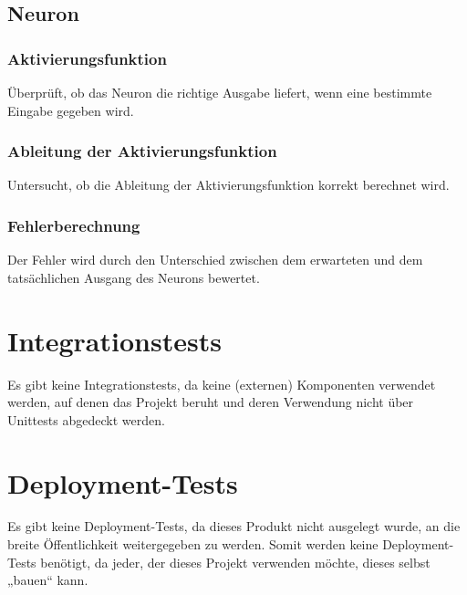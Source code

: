 \subsection{Neuron}
\label{sec:DesignNeuron}
\subsubsection{Aktivierungsfunktion}
\label{sec:DesignAktivierungsfunktion}
Überprüft, ob das Neuron die richtige Ausgabe liefert, wenn eine bestimmte Eingabe gegeben wird.
\subsubsection{Ableitung der Aktivierungsfunktion}
\label{sec:DesignAbleitungDerAktivierungsfunktion}
Untersucht, ob die Ableitung der Aktivierungsfunktion korrekt berechnet wird.
\subsubsection{Fehlerberechnung  }
\label{sec:DesignFehlerberechnung}
Der Fehler wird durch den Unterschied zwischen dem erwarteten und dem tatsächlichen Ausgang des Neurons bewertet.

\section{Integrationstests}
Es gibt keine Integrationstests, da keine (externen) Komponenten verwendet werden, auf denen das Projekt beruht und deren Verwendung nicht über Unittests abgedeckt werden.

\section{Deployment-Tests}
Es gibt keine Deployment-Tests, da dieses Produkt nicht ausgelegt wurde, an die breite Öffentlichkeit weitergegeben zu werden.
Somit werden keine Deployment-Tests benötigt, da jeder, der dieses Projekt verwenden möchte, dieses selbst „bauen“ kann.